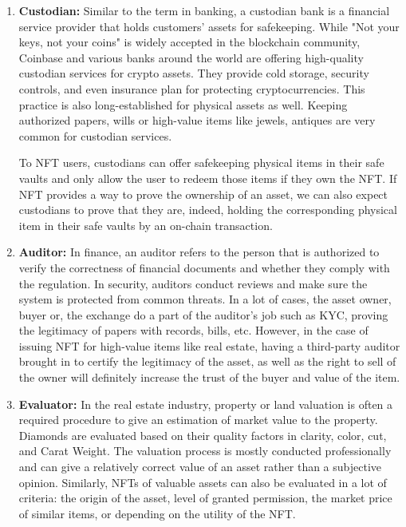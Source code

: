 \documentclass[12pt, titlepage]{article}
\begin{document}
\begin{enumerate}
    \item \textbf{Custodian:} Similar to the term in banking, a custodian bank is a financial service provider that holds customers' assets for safekeeping. While "Not your keys, not your coins" is widely accepted in the blockchain community, Coinbase and various banks around the world are offering high-quality custodian services for crypto assets. They provide cold storage, security controls, and even insurance plan for protecting cryptocurrencies. This practice is also long-established for physical assets as well. Keeping authorized papers, wills or high-value items like jewels, antiques are very common for custodian services.
    
    To NFT users, custodians can offer safekeeping physical items in their safe vaults and only allow the user to redeem those items if they own the NFT. If NFT provides a way to prove the ownership of an asset, we can also expect custodians to prove that they are, indeed, holding the corresponding physical item in their safe vaults by an on-chain transaction.
    
    \item \textbf{Auditor:} In finance, an auditor refers to the person that is authorized to verify the correctness of financial documents and whether they comply with the regulation. In security, auditors conduct reviews and make sure the system is protected from common threats. In a lot of cases, the asset owner, buyer or, the exchange do a part of the auditor's job such as KYC, proving the legitimacy of papers with records, bills, etc. However, in the case of issuing NFT for high-value items like real estate, having a third-party auditor brought in to certify the legitimacy of the asset, as well as the right to sell of the owner will definitely increase the trust of the buyer and value of the item.
    
    \item \textbf{Evaluator:} In the real estate industry, property or land valuation is often a required procedure to give an estimation of market value to the property. Diamonds are evaluated based on their quality factors in clarity, color, cut, and Carat Weight. The valuation process is mostly conducted professionally and can give a relatively correct value of an asset rather than a subjective opinion. Similarly, NFTs of valuable assets can also be evaluated in a lot of criteria: the origin of the asset, level of granted permission, the market price of similar items, or depending on the utility of the NFT.
    

\end{enumerate}
\end{document}
